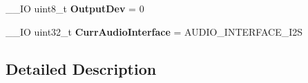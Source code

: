 \begin{DoxyCompactItemize}
\item 
\hypertarget{group___s_t_m32_f4___d_i_s_c_o_v_e_r_y___a_u_d_i_o___c_o_d_e_c___private___variables_ga1419cd62eb14691f4fc058c580c898af}{\-\_\-\-\_\-\-I\-O uint8\-\_\-t {\bfseries Output\-Dev} = 0}\label{group___s_t_m32_f4___d_i_s_c_o_v_e_r_y___a_u_d_i_o___c_o_d_e_c___private___variables_ga1419cd62eb14691f4fc058c580c898af}

\item 
\hypertarget{group___s_t_m32_f4___d_i_s_c_o_v_e_r_y___a_u_d_i_o___c_o_d_e_c___private___variables_ga411de5260ad4ad25e97508e9ad7883f2}{\-\_\-\-\_\-\-I\-O uint32\-\_\-t {\bfseries Curr\-Audio\-Interface} = A\-U\-D\-I\-O\-\_\-\-I\-N\-T\-E\-R\-F\-A\-C\-E\-\_\-\-I2\-S}\label{group___s_t_m32_f4___d_i_s_c_o_v_e_r_y___a_u_d_i_o___c_o_d_e_c___private___variables_ga411de5260ad4ad25e97508e9ad7883f2}

\end{DoxyCompactItemize}


\subsection{Detailed Description}
